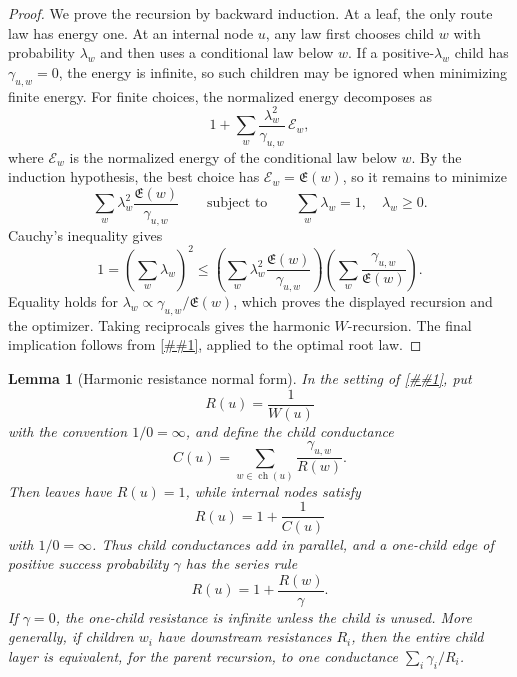 \documentclass[10pt]{article}
\newcommand{\cref}[1]{\ref{##1}}
\newtheorem{lemma}[theorem]{Lemma}
\theoremstyle{definition}
\begin{document}
\begin{proof}
   We prove the recursion by backward induction. At a leaf, the only route law
   has energy one. At an internal node $u$, any law first chooses child $w$
   with probability $\lambda_w$ and then uses a conditional law below $w$.
   If a positive-$\lambda_w$ child has $\gamma_{u,w}=0$, the energy is
   infinite, so such children may be ignored when minimizing finite energy.
   For finite choices, the normalized energy decomposes as
   \[
      1+
      \sum_w
      \frac{\lambda_w^2}{\gamma_{u,w}}\,
      \mathcal E_w,
   \]
   where $\mathcal E_w$ is the normalized energy of the conditional law below
   $w$. By the induction hypothesis, the best choice has
   $\mathcal E_w=\mathfrak E(w)$, so it remains to minimize
   \[
      \sum_w \lambda_w^2\frac{\mathfrak E(w)}{\gamma_{u,w}}
      \qquad\text{subject to}\qquad
      \sum_w\lambda_w=1,\quad \lambda_w\ge0 .
   \]
   Cauchy's inequality gives
   \[
      1
      =
      \left(\sum_w\lambda_w\right)^2
      \le
      \left(\sum_w\lambda_w^2
      \frac{\mathfrak E(w)}{\gamma_{u,w}}\right)
      \left(\sum_w\frac{\gamma_{u,w}}{\mathfrak E(w)}\right).
   \]
   Equality holds for
   $\lambda_w\propto\gamma_{u,w}/\mathfrak E(w)$, which proves the displayed
   recursion and the optimizer. Taking reciprocals gives the harmonic
   $W$-recursion. The final implication follows from
   \cref{cor:route-law-prefix-energy}, applied to the optimal root law.
\end{proof}

\begin{lemma}[Harmonic resistance normal form]
   \label{lem:harmonic-resistance-normal-form}
   In the setting of \cref{lem:optimal-prefix-energy-law}, put
   \[
      R(u)=\frac1{W(u)}
   \]
   with the convention \(1/0=\infty\), and define the child conductance
   \[
      C(u)=\sum_{w\in\operatorname{ch}(u)}\frac{\gamma_{u,w}}{R(w)} .
   \]
   Then leaves have \(R(u)=1\), while internal nodes satisfy
   \[
      R(u)=1+\frac1{C(u)}
      \tag{RN1}
   \]
   with \(1/0=\infty\).  Thus child conductances add in parallel, and a
   one-child edge of positive success probability \(\gamma\) has the series rule
   \[
      R(u)=1+\frac{R(w)}{\gamma}.
      \tag{RN2}
   \]
   If \(\gamma=0\), the one-child resistance is infinite unless the child is
   unused.
   More generally, if children \(w_i\) have downstream resistances \(R_i\),
   then the entire child layer is equivalent, for the parent recursion, to one
   conductance \(\sum_i\gamma_i/R_i\).
\end{lemma}
\end{document}

